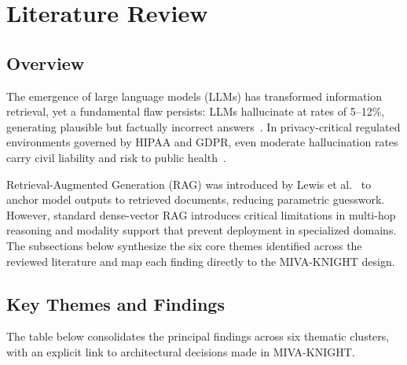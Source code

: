 \documentclass[12pt, a4paper]{article}
\begin{document}
\section{Literature Review}

\subsection{Overview}

The emergence of large language models (LLMs) has transformed information
retrieval, yet a fundamental flaw persists: LLMs hallucinate at rates of
5--12\%, generating plausible but factually incorrect
answers~\cite{zhang2023sirens,ji2023survey}. In privacy-critical regulated
environments governed by HIPAA and GDPR, even moderate hallucination rates
carry civil liability and risk to public health~\cite{tang2024multihop}.

Retrieval-Augmented Generation (RAG) was introduced by Lewis et
al.~\cite{lewis2020rag} to anchor model outputs to retrieved documents,
reducing parametric guesswork. However, standard dense-vector RAG introduces
critical limitations in multi-hop reasoning and modality support that prevent
deployment in specialized domains. The subsections below synthesize the six core
themes identified across the reviewed literature and map each finding directly
to the MIVA-KNIGHT design.

\subsection{Key Themes and Findings}

The table below consolidates the principal findings across six thematic
clusters, with an explicit link to architectural decisions made in MIVA-KNIGHT.
\end{document}
